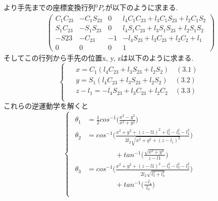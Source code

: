 \documentclass[a4j]{jarticle}			%
\begin{document}
\begin{multicols}{2}
\normalsize
より手先までの座標変換行列$^{0}P_{r}$が以下のように求まる.
\tiny
\begin{equation*}
	\begin{array}{cc}
		\left( 
			\begin{array}{cccc}
				C_1C_{23} & -C_1S_{23} & 0 & l_4C_1C_{23}+l_3C_1S_{23}+l_2C_1S_2 \\
				S_1C_{23} & -S_1S_{23} & 0 & l_4S_1C_{23}+l_3S_1S_{23}+l_2S_1S_2 \\
				-S{23} & -C_{23} & -1 & -l_4S_{23}+l_3C_{23}+l_2C_2+l_1 \\
				0 & 0 & 0 & 1 
			\end{array}
		\right)
	\end{array}
\end{equation*}
\small
そしてこの行列から手先の位置x, y, zは以下のように求まる.
\begin{equation*}
	\left\{
		\begin{array}{c}
		\begin{split}
			&x=C_1(l_4C_{23}+l_3S_{23}+l_2S_2)\quad(3.1) \\
			&y=S_1(l_4C_{23}+l_3S_{23}+l_2S_2)\quad(3.2) \\
			&z-l_1=-l_4S_{23}+l_3C_{23}+l_2C_2\quad(3.3) \\
		\end{split}
	\end{array}
	\right.
\end{equation*}
これらの逆運動学を解くと
\tiny
\begin{equation}
	\left\{
		\begin{array}{c}
		\begin{split}
			\theta_1&=\frac{1}{2}cos^{-1}\biggl( \frac{x^2-y^2}{x^2+y^2} \biggr) \\
			\theta_2&= cos^{-1}\biggl( \frac{x^2+y^2+(z-l1)^2+l_2^2-l_3^2-l_4^2}{2l_    2\sqrt{x^2+y^2+(z-l_1)^2}} \biggr)\\
			&\qquad\qquad+tan^{-1}\biggl( \frac{\sqrt{x^2+y^2}}{z-l1}\biggr) \\
			\theta_3&=cos^{-1}\biggl( \frac{x^2+y^2+(z-l1)^2-l_4^2-l_3^2-l_2^2}{2l_2    \sqrt{l_3^2+l_4^2}}\biggr)\\
			&\qquad\qquad+tan^{-1}\biggl( \frac{-l_4}{l_3}\biggr)\\
		\end{split}
		\end{array}
	\right.
\end{equation}
\normalsize


\end{multicols}
\end{document}
